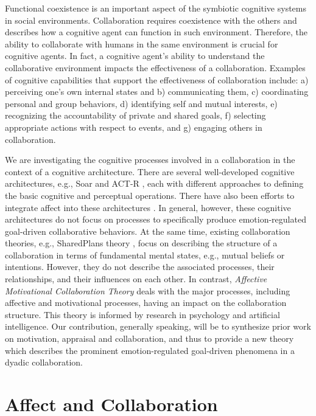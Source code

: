 \documentclass[letterpaper]{article}
\begin{document}
Functional coexistence is an important aspect of the symbiotic cognitive
systems in social environments. Collaboration requires coexistence with
the others and describes how a cognitive agent can function in such environment.
Therefore, the ability to collaborate with humans in the same environment is
crucial for cognitive agents. In fact, a cognitive agent's ability to understand
the collaborative environment impacts the effectiveness of a collaboration.
Examples of cognitive capabilities that support the effectiveness of
collaboration include: a) perceiving one's own internal states and b)
communicating them, c) coordinating personal and group behaviors, d) identifying
self and mutual interests, e) recognizing the accountability of private and
shared goals, f) selecting appropriate actions with respect to events, and g)
engaging others in collaboration.

We are investigating the cognitive processes involved in a collaboration in the
context of a cognitive architecture. There are several well-developed cognitive
architectures, e.g., Soar \cite{laird:soar} and ACT-R \cite{anderson:act-r},
each with different approaches to defining the basic cognitive and perceptual
operations. There have also been efforts to integrate affect into these
architectures \cite{dancy:actR-physiology-affect,marinier:behavior-emotion}. In
general, however, these cognitive architectures do not focus on processes to
specifically produce emotion-regulated goal-driven collaborative behaviors. At
the same time, existing collaboration theories, e.g., SharedPlans theory
\cite{grosz:plans-discourse}, focus on describing the structure of a
collaboration in terms of fundamental mental states, e.g., mutual beliefs or
intentions. However, they do not describe the associated processes, their
relationships, and their influences on each other. In contrast,
\textit{Affective Motivational Collaboration Theory} deals with the major
processes, including affective and motivational processes, having an impact on
the collaboration structure. This theory is informed by research in psychology
and artificial intelligence. Our contribution, generally speaking, will be to
synthesize prior work on motivation, appraisal and collaboration, and thus to
provide a new theory which describes the prominent emotion-regulated goal-driven
phenomena in a dyadic collaboration.

\vspace*{-3mm}
\section{Affect and Collaboration}
\end{document}
